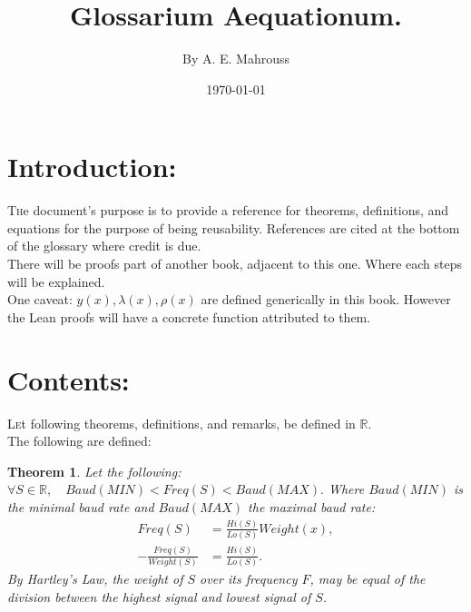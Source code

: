 \documentclass[10pt]{article}
\title{%
	\vspace{-1.5em}%
	\large\textbf{Glossarium Aequationum.}%
}
\author{By A. E. Mahrouss}
\date{\today}
\theoremstyle{plain}
\newtheorem{theorem}{Theorem}[section]
\theoremstyle{definition}
\theoremstyle{remark}
\begin{document}

\maketitle
\tableofcontents
\newpage

\section{Introduction:}

\lettrine[lines=2, lhang=0.1, loversize=0.2]{T}he document's purpose is to provide a reference for theorems, definitions, and equations for the purpose of being reusability. References are cited at the bottom of the glossary where credit is due.\\
There will be proofs part of another book, adjacent to this one. Where each steps will be explained.\\
One caveat: $y(x), \lambda(x), \rho(x)$ are defined generically in this book. However the Lean proofs will have a concrete function attributed to them.

\section{Contents:}

\lettrine[lines=1, lhang=0.1, loversize=0.2]{L}et following theorems, definitions, and remarks, be defined in $\mathbb{R}.$\\The following are defined:

\begin{theorem}
Let the following:
$\forall S \in \mathbb{R}, \quad Baud(MIN) < Freq(S) < Baud(MAX).$ Where $Baud(MIN)$ is the minimal baud rate and $Baud(MAX)$ the maximal baud rate:
\begin{align*}
	Freq(S) &= \frac{Hi(S)}{Lo(S)} Weight(x),\\
	-\frac{Freq(S)}{Weight(S)} &= \frac{Hi(S)}{Lo(S)}.
\end{align*}
By Hartley's Law, the weight of $S$ over its frequency $F$, may be equal of the division between the highest signal and lowest signal of $S$.
\end{theorem}
\end{document}
